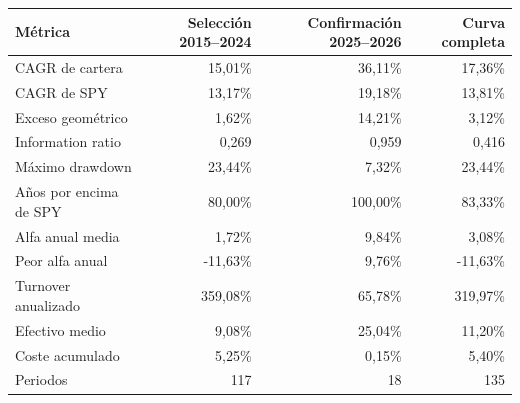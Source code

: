\begin{tabular}{lrrr}
\toprule
Métrica & Selección 2015–2024 & Confirmación 2025–2026 & Curva completa \\
\midrule
CAGR de cartera & 15,01\% & 36,11\% & 17,36\% \\
CAGR de SPY & 13,17\% & 19,18\% & 13,81\% \\
Exceso geométrico & 1,62\% & 14,21\% & 3,12\% \\
Information ratio & 0,269 & 0,959 & 0,416 \\
Máximo drawdown & 23,44\% & 7,32\% & 23,44\% \\
Años por encima de SPY & 80,00\% & 100,00\% & 83,33\% \\
Alfa anual media & 1,72\% & 9,84\% & 3,08\% \\
Peor alfa anual & -11,63\% & 9,76\% & -11,63\% \\
Turnover anualizado & 359,08\% & 65,78\% & 319,97\% \\
Efectivo medio & 9,08\% & 25,04\% & 11,20\% \\
Coste acumulado & 5,25\% & 0,15\% & 5,40\% \\
Periodos & 117 & 18 & 135 \\
\bottomrule
\end{tabular}
